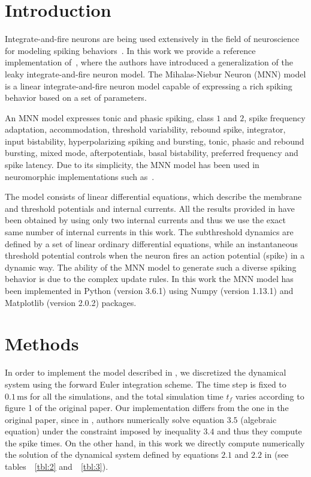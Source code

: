 \documentclass[10pt,a4paper,onecolumn]{article}
\begin{document}
\section{Introduction}\label{introduction}

Integrate-and-fire neurons are being used extensively in the field of
neuroscience for modeling spiking behaviors~\autocite{dayan:2001}. In
this work we provide a reference implementation
of~\autocite{mihalas:2009}, where the authors have introduced a
generalization of the leaky integrate-and-fire neuron model. The
Mihalas-Niebur Neuron (MNN) model is a linear integrate-and-fire neuron
model capable of expressing a rich spiking behavior based on a set of
parameters.

An MNN model expresses tonic and phasic spiking, class \(1\) and \(2\),
spike frequency adaptation, accommodation, threshold variability,
rebound spike, integrator, input bistability, hyperpolarizing spiking
and bursting, tonic, phasic and rebound bursting, mixed mode,
afterpotentials, basal bistability, preferred frequency and spike
latency. Due to its simplicity, the MNN model has been used in
neuromorphic implementations such as~\autocite{folowosele:2011}.

The model consists of linear differential equations, which describe the
membrane and threshold potentials and internal currents. All the results
provided in \autocite{mihalas:2009} have been obtained by using only two
internal currents and thus we use the exact same number of internal
currents in this work. The subthreshold dynamics are defined by a set of
linear ordinary differential equations, while an instantaneous threshold
potential controls when the neuron fires an action potential (spike) in
a dynamic way. The ability of the MNN model to generate such a diverse
spiking behavior is due to the complex update rules. In this work the
MNN model has been implemented in Python (version 3.6.1) using Numpy
(version 1.13.1) and Matplotlib (version 2.0.2) packages.

\section{Methods}\label{methods}

In order to implement the model described in \autocite{mihalas:2009}, we
discretized the dynamical system using the forward Euler integration
scheme. The time step is fixed to \(0.1\, \mathrm{ms}\) for all the
simulations, and the total simulation time \(t_f\) varies according to
figure 1 of the original paper. Our implementation differs from the one
in the original paper, since in \autocite{mihalas:2009}, authors
numerically solve equation \(3.5\) (algebraic equation) under the
constraint imposed by inequality \(3.4\) and thus they compute the spike
times. On the other hand, in this work we directly compute numerically
the solution of the dynamical system defined by equations \(2.1\) and
\(2.2\) in \autocite{mihalas:2009} (see tables~~\ref{tbl:2}
and~~\ref{tbl:3}).
\end{document}
